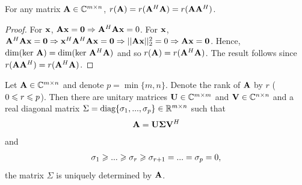 \begin{proposition}{}{}
    For any matrix $\bold{A}\in \mathbb{C}^{m\times n}$, $r(\bold{A})=r(\bold{A}^H\bold{A})=r(\bold{A}\bold{A}^H)$.
\end{proposition}
\begin{proof}
    For $\bold{x}$, $\bold{Ax}=\bold{0}\Rightarrow \bold{A}^H\bold{Ax}=0$.
    For $\bold{x}$, $\bold{A}^H\bold{Ax}=\bold{0}\Rightarrow \bold{x}^H\bold{A}^H\bold{Ax}=\bold{0}\Rightarrow ||\bold{Ax}||_2^2=0\Rightarrow \bold{Ax}=\bold{0}$.
    Hence, $\text{dim(ker } \bold{A})=\text{dim(ker } \bold{A}^H\bold{A})$ and so $r(\bold{A})=r(\bold{A}^H\bold{A})$. 
    The result follows since $r(\bold{A}\bold{A}^H)=r(\bold{A}^H\bold{A})$.
\end{proof}

\begin{theorem}{}{}
    Let $\bold{A}\in \mathbb{C}^{m\times n}$ and denote $p=\min\{m,n\}$.
    Denote the rank of $\bold{A}$ by $r$ ($0\leqslant r\leqslant p$).
    Then there are unitary matrices $\bold{U}\in \mathbb{C}^{m\times m}$ and $\bold{V}\in \mathbb{C}^{n\times n}$
    and a real diagonal matrix $\Sigma =\text{diag} \{\sigma_1,...,\sigma_p\}\in \mathbb{R}^{m\times n}$ such that 
    \begin{align*}
        \bold{A}=\bold{U}\bold{\Sigma}\bold{V}^H
    \end{align*}
    and 
    \begin{align*}
        \sigma_1\geqslant ...\geqslant \sigma_r\geqslant \sigma_{r+1}=...=\sigma_p=0,
    \end{align*}
    the matrix $\Sigma$ is uniquely determined by $\bold{A}$.
\end{theorem}

